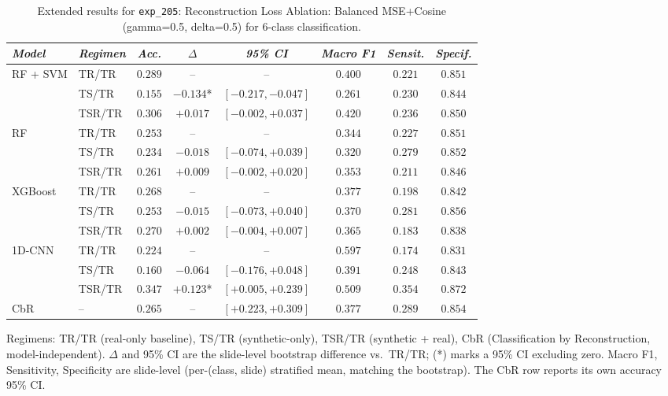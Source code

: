 \begin{table}[htp]
\centering
\scriptsize
\caption{Extended results for \texttt{exp\_205}: Reconstruction Loss Ablation: Balanced MSE+Cosine (gamma=0.5, delta=0.5) for 6-class classification.}
\label{tab:appendix_exp_205}
\begin{tabular*}{\textwidth}{@{\extracolsep{\fill}}llcccccc}
\toprule
\emph{Model} & \emph{Regimen} & \emph{Acc.} & \emph{$\Delta$} & \emph{95\% CI} & \emph{Macro F1} & \emph{Sensit.} & \emph{Specif.}\\
\midrule
\multirow{3}{*}{RF + SVM} & TR/TR & $0.289$ & -- & -- & $0.400$ & $0.221$ & $0.851$\\
 & TS/TR & $0.155$ & $-0.134$* & $[-0.217, -0.047]$ & $0.261$ & $0.230$ & $0.844$\\
 & TSR/TR & $0.306$ & $+0.017$ & $[-0.002, +0.037]$ & $0.420$ & $0.236$ & $0.850$\\
\midrule
\multirow{3}{*}{RF} & TR/TR & $0.253$ & -- & -- & $0.344$ & $0.227$ & $0.851$\\
 & TS/TR & $0.234$ & $-0.018$ & $[-0.074, +0.039]$ & $0.320$ & $0.279$ & $0.852$\\
 & TSR/TR & $0.261$ & $+0.009$ & $[-0.002, +0.020]$ & $0.353$ & $0.211$ & $0.846$\\
\midrule
\multirow{3}{*}{XGBoost} & TR/TR & $0.268$ & -- & -- & $0.377$ & $0.198$ & $0.842$\\
 & TS/TR & $0.253$ & $-0.015$ & $[-0.073, +0.040]$ & $0.370$ & $0.281$ & $0.856$\\
 & TSR/TR & $0.270$ & $+0.002$ & $[-0.004, +0.007]$ & $0.365$ & $0.183$ & $0.838$\\
\midrule
\multirow{3}{*}{1D-CNN} & TR/TR & $0.224$ & -- & -- & $0.597$ & $0.174$ & $0.831$\\
 & TS/TR & $0.160$ & $-0.064$ & $[-0.176, +0.048]$ & $0.391$ & $0.248$ & $0.843$\\
 & TSR/TR & $0.347$ & $+0.123$* & $[+0.005, +0.239]$ & $0.509$ & $0.354$ & $0.872$\\
\midrule
CbR & -- & $0.265$ & -- & $[+0.223, +0.309]$ & $0.377$ & $0.289$ & $0.854$\\
\bottomrule
\end{tabular*}
\small{Regimens: TR/TR (real-only baseline), TS/TR (synthetic-only), TSR/TR (synthetic + real), CbR (Classification by Reconstruction, model-independent). $\Delta$ and 95\% CI are the slide-level bootstrap difference vs.\ TR/TR; (*) marks a 95\% CI excluding zero. Macro F1, Sensitivity, Specificity are slide-level (per-(class, slide) stratified mean, matching the bootstrap). The CbR row reports its own accuracy 95\% CI.}
\end{table}

